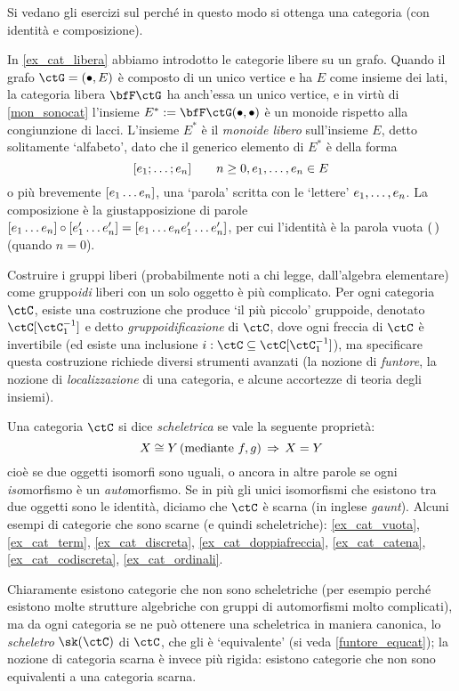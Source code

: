 Si vedano gli esercizi sul perché in questo modo si ottenga una categoria (con identità e composizione).
\begin{example}\label{mongruppi_liberi}
	In \ref{ex_cat_libera} abbiamo introdotto le categorie libere su un grafo. Quando il grafo \(\ctG=(\bullet,E)\) è composto di un unico vertice e ha \(E\) come insieme dei lati, la categoria libera \(\bfF\ctG\) ha anch'essa un unico vertice, e in virtù di \ref{mon_sonocat} l'insieme \(E^* := \bfF\ctG(\bullet,\bullet)\) è un monoide rispetto alla congiunzione di lacci. L'insieme \(E^*\) è il \emph{monoide libero} sull'insieme \(E\), detto solitamente `alfabeto', dato che il generico elemento di \(E^*\) è della forma
	\[[\tup en;]\qquad n\ge 0, \tup en,\in E\]
	o più brevemente \([\tup en{}]\), una `parola' scritta con le `lettere' \(\tup en,\). La composizione è la giustapposizione di parole \([\tup en{}]\cmp[\tup {e'}n{}] = [\tup en{}\tup{e'}n{}]\), per cui l'identità è la parola vuota \((\,)\) (quando \(n=0\)).

	Costruire i gruppi liberi (probabilmente noti a chi legge, dall'algebra elementare) come gruppo\emph{idi} liberi con un solo oggetto è più complicato. Per ogni categoria \(\ctC\), esiste una costruzione che produce `il più piccolo' gruppoide, denotato \(\ctC[\ctC_1^{-1}]\) e detto \emph{gruppoidificazione} di \(\ctC\), dove ogni freccia di \(\ctC\) è invertibile (ed esiste una inclusione \(i : \ctC\subseteq \ctC[\ctC_1^{-1}]\)), ma specificare questa costruzione richiede diversi strumenti avanzati (la nozione di \emph{funtore}, la nozione di \emph{localizzazione} di una categoria, e alcune accortezze di teoria degli insiemi).
\end{example}
\begin{definition}\label{def_cat_scheletrica}
	Una categoria \(\ctC\) si dice \emph{scheletrica} se vale la seguente proprietà:
	\[X\cong Y \, (\text{mediante } f,g) \,\Rightarrow\, X=Y\]
	cioè se due oggetti isomorfi sono uguali, o ancora in altre parole se ogni \emph{iso}morfismo è un \emph{auto}morfismo. Se in più gli unici isomorfismi che esistono tra due oggetti sono le identità, diciamo che \(\ctC\) è scarna (in inglese \emph{gaunt}). Alcuni esempi di categorie che sono scarne (e quindi scheletriche): \ref{ex_cat_vuota}, \ref{ex_cat_term}, \ref{ex_cat_discreta}, \ref{ex_cat_doppiafreccia}, \ref{ex_cat_catena}, \ref{ex_cat_codiscreta}, \ref{ex_cat_ordinali}.
\end{definition}
Chiaramente esistono categorie che non sono scheletriche (per esempio perché esistono molte strutture algebriche con gruppi di automorfismi molto complicati), ma da ogni categoria se ne può ottenere una scheletrica in maniera canonica, lo \emph{scheletro} \(\sk(\ctC)\) di \(\ctC\), che gli è `equivalente' (si veda \ref{funtore_equcat}); la nozione di categoria scarna è invece più rigida: esistono categorie che non sono equivalenti a una categoria scarna.


